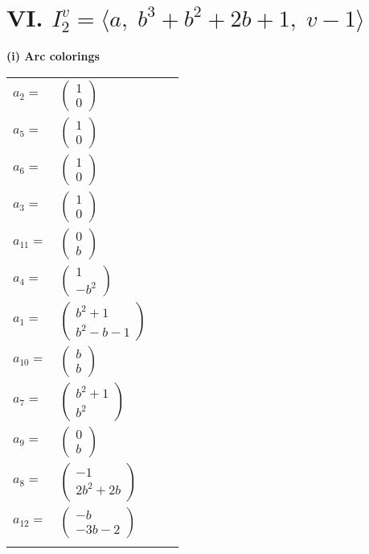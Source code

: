 \documentclass[1p]{elsarticle_modified}
\theoremstyle{definition}
\begin{document}
\centering \section*{VI. $I^v_{2}= \langle a,\;b^3+b^2+2 b+1,\;v-1 \rangle$}
\flushleft \textbf{(i) Arc colorings}\\
\begin{tabular}{m{7pt} m{180pt} m{7pt} m{180pt} }
\flushright $a_{2}=$&$\begin{pmatrix}1\\0\end{pmatrix}$ \\
\flushright $a_{5}=$&$\begin{pmatrix}1\\0\end{pmatrix}$ \\
\flushright $a_{6}=$&$\begin{pmatrix}1\\0\end{pmatrix}$ \\
\flushright $a_{3}=$&$\begin{pmatrix}1\\0\end{pmatrix}$ \\
\flushright $a_{11}=$&$\begin{pmatrix}0\\b\end{pmatrix}$ \\
\flushright $a_{4}=$&$\begin{pmatrix}1\\- b^2\end{pmatrix}$ \\
\flushright $a_{1}=$&$\begin{pmatrix}b^2+1\\b^2- b-1\end{pmatrix}$ \\
\flushright $a_{10}=$&$\begin{pmatrix}b\\b\end{pmatrix}$ \\
\flushright $a_{7}=$&$\begin{pmatrix}b^2+1\\b^2\end{pmatrix}$ \\
\flushright $a_{9}=$&$\begin{pmatrix}0\\b\end{pmatrix}$ \\
\flushright $a_{8}=$&$\begin{pmatrix}-1\\2 b^2+2 b\end{pmatrix}$ \\
\flushright $a_{12}=$&$\begin{pmatrix}- b\\-3 b-2\end{pmatrix}$\\&\end{tabular}
\end{document}
